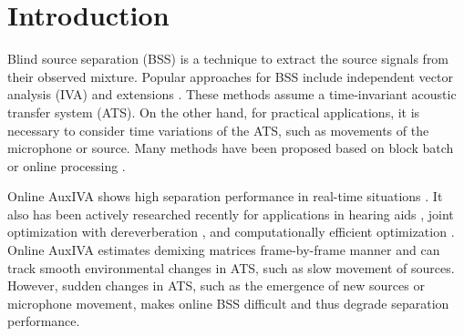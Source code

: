 \documentclass[sip,biber]{now-journal}
\begin{document}
\section{Introduction}\label{sec:intro}
%
%
Blind source separation (BSS) \cite{Makino:2018:ASS} is a technique to extract the source signals from their observed mixture.
Popular approaches for BSS include independent vector analysis (IVA) \cite{Kim:2006:ASLP,Hiroe:2006:ICA} and extensions \cite{Kitamura:2016:ASLP,Nugraha:2020:SPL,Brendel:2020:SP}.
These methods assume a time-invariant acoustic transfer system (ATS).
On the other hand, for practical applications, it is necessary to consider time variations of the ATS, such as movements of the microphone or source.
Many methods have been proposed based on block batch \cite{Koldovsky:2019:ICASSP,Koldovsky:2021:SP,Jansky:2022:ASMP} or online processing \cite{Kim:2010:CASI,Taniguchi:2014:HSCMA}.

Online AuxIVA shows high separation performance in real-time situations \cite{Taniguchi:2014:HSCMA}.
It also has been actively researched recently for applications in hearing aids \cite{Sunohara:2017:ICASSP}, joint optimization with dereverberation \cite{Ueda:2021:ICASSP}, and computationally efficient optimization \cite{Nakashima:2023:ICASSP}.
Online AuxIVA estimates demixing matrices frame-by-frame manner and can track smooth environmental changes in ATS, such as slow movement of sources.
However, sudden changes in ATS, such as the emergence of new sources or microphone movement, makes online BSS difficult and thus degrade separation performance.
\end{document}
